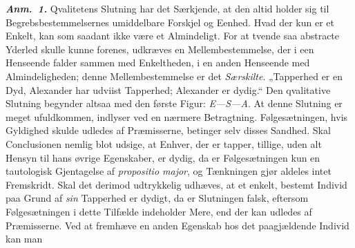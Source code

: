 \documentclass[12pt]{book}
\newcommand{\anm}[1]{\emph{\textbf{Anm.~#1.}}}
\begin{document}
\anm{1} Qvalitetens Slutning har det Særkjende, at den altid holder sig til
Begrebsbestemmelsernes umiddelbare Forskjel og Eenhed. Hvad der kun er et Enkelt,
kan som saadant ikke være et Almindeligt. For at tvende saa abstracte Yderled skulle
kunne forenes, udkræves en Mellembestemmelse, der i een Henseende falder sammen med
Enkeltheden, i en anden Henseende med Almindeligheden; denne Mellembestemmelse er
det \emph{Særskilte}. „Tapperhed er en Dyd, Alexander har udviist Tapperhed;
Alexander er dydig.“ Den qvalitative Slutning begynder altsaa med den første Figur:
\textit{E---S---A}. At denne Slutning er meget ufuldkommen, indlyser ved en nærmere
Betragtning. Følgesætningen, hvis Gyldighed skulde udledes af Præmisserne, betinger
selv disses Sandhed. Skal Conclusionen nemlig blot udsige, at Enhver, der er tapper,
tillige, uden alt Hensyn til hans øvrige Egenskaber, er dydig, da er Følgesætningen
kun en tautologisk Gjentagelse af \textit{propositio major}, og Tænkningen gjør
aldeles intet Fremskridt. Skal det derimod udtrykkelig udhæves, at et enkelt,
bestemt Individ paa Grund af \emph{sin} Tapperhed er dydigt, da er Slutningen falsk,
eftersom Følgesætningen i dette Tilfælde indeholder Mere, end der kan udledes af
Præmisserne. Ved at fremhæve en anden Egenskab hos det paagjældende Individ kan man
\end{document}
